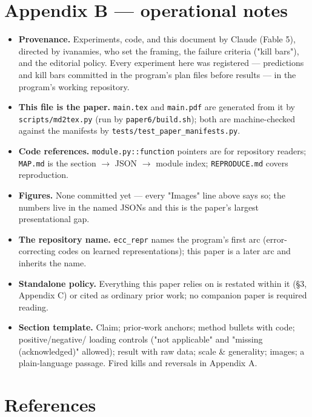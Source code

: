 \documentclass[10pt]{article}
\begin{document}
\section{Appendix B --- operational notes}

\begin{itemize}\setlength\itemsep{1pt}
\item \textbf{Provenance.} Experiments, code, and this document by Claude (Fable 5), directed by ivanamies, who set the framing, the failure criteria ("kill bars"), and the editorial policy. Every experiment here was registered --- predictions and kill bars committed in the program's plan files before results --- in the program's working repository.
\item \textbf{This file is the paper.} \texttt{main.tex} and \texttt{main.pdf} are generated from it by \texttt{scripts/md2tex.py} (run by \texttt{paper6/build.sh}); both are machine-checked against the manifests by \texttt{tests/test\_paper\_manifests.py}.
\item \textbf{Code references.} \texttt{module.py::function} pointers are for repository readers; \texttt{MAP.md} is the section $\to$ JSON $\to$ module index; \texttt{REPRODUCE.md} covers reproduction.
\item \textbf{Figures.} None committed yet --- every "Images" line above says so; the numbers live in the named JSONs and this is the paper's largest presentational gap.
\item \textbf{The repository name.} \texttt{ecc\_repr} names the program's first arc (error-correcting codes on learned representations); this paper is a later arc and inherits the name.
\item \textbf{Standalone policy.} Everything this paper relies on is restated within it (§3, Appendix C) or cited as ordinary prior work; no companion paper is required reading.
\item \textbf{Section template.} Claim; prior-work anchors; method bullets with code; positive/negative/ loading controls ("not applicable" and "missing (acknowledged)" allowed); result with raw data; scale \& generality; images; a plain-language passage. Fired kills and reversals in Appendix A.
\end{itemize}
\section{References}
\end{document}
